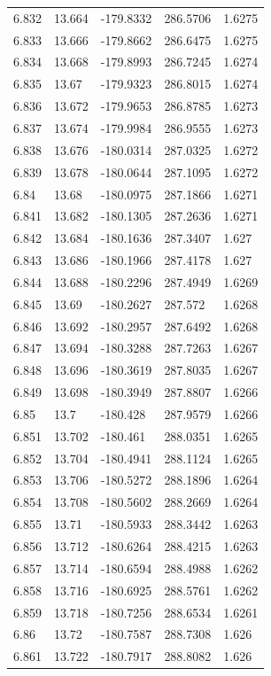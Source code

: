 \begin{tabular}{lllll}
6.832 & 13.664 & -179.8332 & 286.5706 & 1.6275 \\
6.833 & 13.666 & -179.8662 & 286.6475 & 1.6275 \\
6.834 & 13.668 & -179.8993 & 286.7245 & 1.6274 \\
6.835 & 13.67 & -179.9323 & 286.8015 & 1.6274 \\
6.836 & 13.672 & -179.9653 & 286.8785 & 1.6273 \\
6.837 & 13.674 & -179.9984 & 286.9555 & 1.6273 \\
6.838 & 13.676 & -180.0314 & 287.0325 & 1.6272 \\
6.839 & 13.678 & -180.0644 & 287.1095 & 1.6272 \\
6.84 & 13.68 & -180.0975 & 287.1866 & 1.6271 \\
6.841 & 13.682 & -180.1305 & 287.2636 & 1.6271 \\
6.842 & 13.684 & -180.1636 & 287.3407 & 1.627 \\
6.843 & 13.686 & -180.1966 & 287.4178 & 1.627 \\
6.844 & 13.688 & -180.2296 & 287.4949 & 1.6269 \\
6.845 & 13.69 & -180.2627 & 287.572 & 1.6268 \\
6.846 & 13.692 & -180.2957 & 287.6492 & 1.6268 \\
6.847 & 13.694 & -180.3288 & 287.7263 & 1.6267 \\
6.848 & 13.696 & -180.3619 & 287.8035 & 1.6267 \\
6.849 & 13.698 & -180.3949 & 287.8807 & 1.6266 \\
6.85 & 13.7 & -180.428 & 287.9579 & 1.6266 \\
6.851 & 13.702 & -180.461 & 288.0351 & 1.6265 \\
6.852 & 13.704 & -180.4941 & 288.1124 & 1.6265 \\
6.853 & 13.706 & -180.5272 & 288.1896 & 1.6264 \\
6.854 & 13.708 & -180.5602 & 288.2669 & 1.6264 \\
6.855 & 13.71 & -180.5933 & 288.3442 & 1.6263 \\
6.856 & 13.712 & -180.6264 & 288.4215 & 1.6263 \\
6.857 & 13.714 & -180.6594 & 288.4988 & 1.6262 \\
6.858 & 13.716 & -180.6925 & 288.5761 & 1.6262 \\
6.859 & 13.718 & -180.7256 & 288.6534 & 1.6261 \\
6.86 & 13.72 & -180.7587 & 288.7308 & 1.626 \\
6.861 & 13.722 & -180.7917 & 288.8082 & 1.626 \\

\end{tabular}
